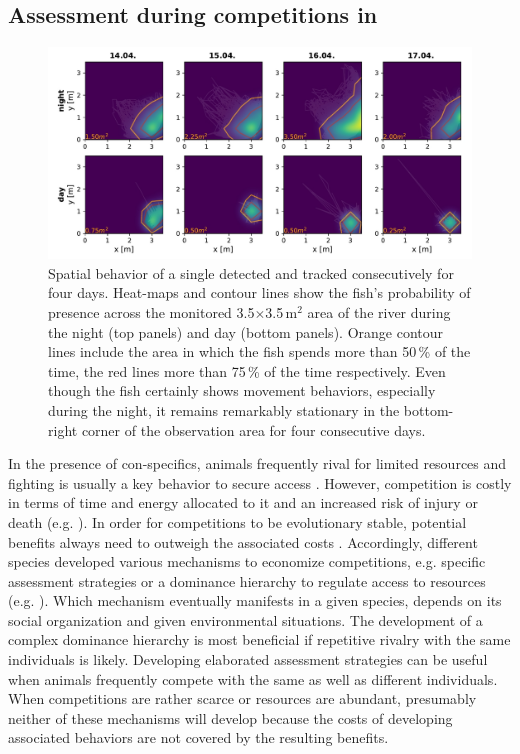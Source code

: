 \subsection{Assessment during competitions in \lepto{}}

\begin{figure}[h!]
  \centerline{\includegraphics[width=1\textwidth]{stationary_jpg}}
  \caption{\label{Colombia_stationarity} Spatial behavior of a single \macros{} detected and tracked consecutively for four days. Heat-maps and contour lines show the fish's probability of presence across the monitored 3.5$\times$3.5\,m$^2$ area of the river during the night (top panels) and day (bottom panels). Orange contour lines include the area in which the fish spends more than 50\,\% of the time, the red lines more than 75\,\% of the time respectively. Even though the fish certainly shows movement behaviors, especially during the night, it remains remarkably stationary in the bottom-right corner of the observation area for four consecutive days.}
\end{figure}

In the presence of con-specifics, animals frequently rival for limited resources and fighting is usually a key behavior to secure access \citep{Cluttonbrock1979, Chapman1995, Markham2015}. However, competition is costly in terms of time and energy allocated to it and an increased risk of injury or death (e.g. \citealp{Briffa2004}). In order for competitions to be evolutionary stable, potential benefits always need to outweigh the associated costs \citep{ArnottElwood2009}. Accordingly, different species developed various mechanisms to economize competitions, e.g. specific assessment strategies \citep{EnquistLeimar1987, Payne1998, Taylor2003} or a dominance hierarchy to regulate access to resources (e.g. \citealp{Janson1985, Sapolsky2005}). Which mechanism eventually manifests in a given species, depends on its social organization and given environmental situations. The development of a complex dominance hierarchy is most beneficial if repetitive rivalry with the same individuals is likely. Developing elaborated assessment strategies can be useful when animals frequently compete with the same as well as different individuals. When competitions are rather scarce or resources are abundant, presumably neither of these mechanisms will develop because the costs of developing associated behaviors are not covered by the resulting benefits.

